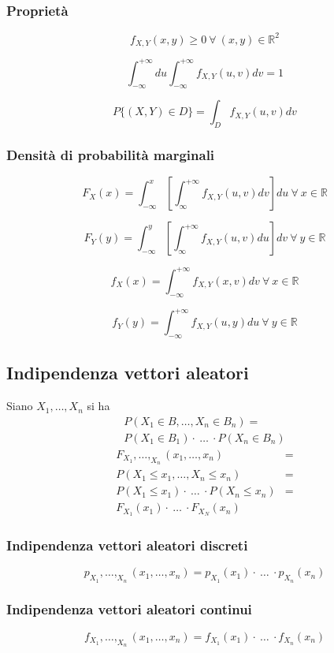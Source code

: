 \begin{multicols*}{2}
\subsubsection*{Proprietà}
$$
f_{X,Y}(x,y) \ge 0 \ \forall \ (x,y) \in \mathbb{R}^2
$$

$$
\int_{-\infty}^{+\infty}du \int_{-\infty}^{+\infty} f_{X,Y}(u,v) dv = 1
$$

$$
P\{(X,Y) \in D\} = \int_{D} f_{X,Y}(u,v) dv
$$

\subsubsection*{Densità di probabilità marginali}
$$
F_X(x) = \int_{-\infty}^{x}\left[\int_{\infty}^{+\infty} f_{X,Y}(u,v) dv\right] du \ \forall \ x \in \mathbb{R}
$$

$$
F_Y(y) = \int_{-\infty}^{y}\left[\int_{\infty}^{+\infty} f_{X,Y}(u,v) du\right] dv \ \forall \ y \in \mathbb{R}
$$

$$
f_X(x) = \int_{-\infty}^{+\infty} f_{X,Y}(x,v) dv \ \forall \ x \in \mathbb{R}
$$

$$
f_Y(y) = \int_{-\infty}^{+\infty} f_{X,Y}(u,y) du \ \forall \ y \in \mathbb{R}
$$

\subsection*{Indipendenza vettori aleatori}
Siano $X_1,\dots,X_n$ si ha
\begin{align*}
P(X_1 \in B,\dots, X_n \in B_n) =
\\P(X_1 \in B_1) \cdot \ \dots \ \cdot P(X_n \in B_n)
\end{align*}
\begin{align*}
F_{X_1}, \dots, _{X_n}(x_1, \dots, x_n) &=
\\P(X_1 \le x_1, \dots, X_n \le x_n) &= 
\\P(X_1 \le x_1)\cdot \ \dots \ \cdot P(X_n \le x_n) &= 
\\F_{X_1}(x_1) \cdot \ \dots \ \cdot F_{X_N}(x_n)
\end{align*}

\subsubsection*{Indipendenza vettori aleatori discreti}
$$
p_{X_1},\dots,_{X_n}(x_1,\dots,x_n) = p_{X_1}(x_1) \cdot \ \dots \ \cdot p_{X_n}(x_n)
$$

\subsubsection*{Indipendenza vettori aleatori continui}
$$
f_{X_1},\dots,_{X_n}(x_1,\dots,x_n) = f_{X_1}(x_1) \cdot \ \dots \ \cdot f_{X_n}(x_n)
$$


\end{multicols*}

